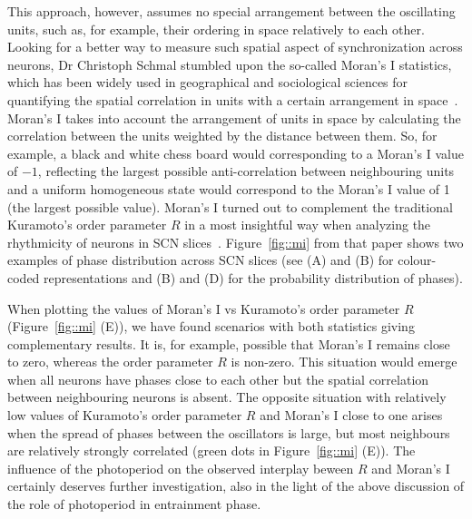This approach, however, assumes no special arrangement between the
oscillating units, such as, for example, their ordering in space
relatively to each other. Looking for a better way to measure such
spatial aspect of synchronization across neurons, Dr Christoph Schmal
stumbled upon the so-called Moran's I statistics, which has been
widely used in geographical and sociological sciences for quantifying
the spatial correlation in units with a certain arrangement in
space~\cite{moran1950notes}. Moran's I takes into account the
arrangement of units in space by calculating the correlation between
the units weighted by the distance between them. So, for example, a
black and white chess board would corresponding to a Moran's I value
of $-1$, reflecting the largest possible anti-correlation between
neighbouring units and a uniform homogeneous state would correspond to
the Moran's I value of 1 (the largest possible value). Moran's I
turned out to complement the traditional Kuramoto's order parameter
$R$ in a most insightful way when analyzing the rhythmicity of neurons
in SCN slices~\cite{schmal2017moran}. Figure~\ref{fig::mi} from that
paper shows two examples of phase distribution across SCN slices (see
(A) and (B) for colour-coded representations and (B) and (D) for the
probability distribution of phases).

When plotting the values of Moran's I vs Kuramoto's order parameter
$R$ (Figure~\ref{fig::mi} (E)), we have found scenarios with both
statistics giving complementary results. It is, for example, possible
that Moran's I remains close to zero, whereas the order parameter $R$
is non-zero. This situation would emerge when all neurons have phases
close to each other but the spatial correlation between neighbouring
neurons is absent. The opposite situation with relatively low values
of Kuramoto's order parameter $R$ and Moran's I close to one arises
when the spread of phases between the oscillators is large, but most
neighbours are relatively strongly correlated (green dots in
Figure~\ref{fig::mi} (E)). The influence of the photoperiod on the
observed interplay beween $R$ and Moran's I certainly deserves further
investigation, also in the light of the above discussion of the role
of photoperiod in entrainment phase.

